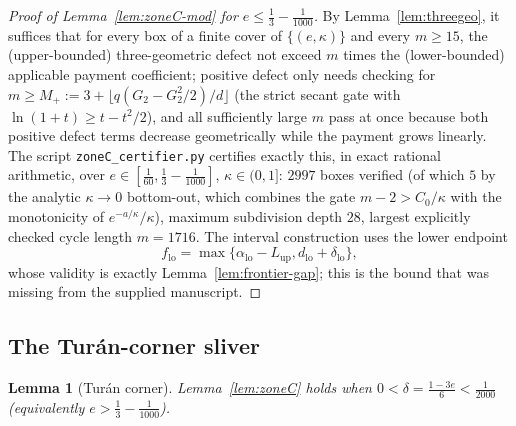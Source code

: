 \documentclass[11pt]{article}
\newtheorem{lemma}[theorem]{Lemma}
\begin{document}
\begin{proof}[Proof of Lemma~\ref{lem:zoneC-mod} for $e\le\tfrac13-\tfrac1{1000}$]
By Lemma~\ref{lem:threegeo}, it suffices that for every box of a finite cover
of $\{(e,\kappa)\}$ and every $m\ge15$, the (upper-bounded) three-geometric
defect not exceed $m$ times the (lower-bounded) applicable payment
coefficient; positive defect only needs checking for
$m\ge M_+:=3+\lfloor q(G_2-G_2^2/2)/d\rfloor$ (the strict secant
gate with $\ln(1+t)\ge t-t^2/2$), and all sufficiently large $m$ pass at once because
both positive defect terms decrease geometrically while the payment grows
linearly.  The script \texttt{zoneC\_certifier.py} certifies exactly this, in
exact rational arithmetic, over $e\in[\tfrac1{60},\tfrac13-\tfrac1{1000}]$,
$\kappa\in(0,1]$: $2997$ boxes verified (of which $5$ by the analytic
$\kappa\to0$ bottom-out, which combines the gate $m-2>C_0/\kappa$ with the
monotonicity of $e^{-a/\kappa}/\kappa$), maximum subdivision depth $28$,
largest explicitly checked cycle length $m=1716$.  The interval
construction uses the lower endpoint
\[
        f_{\mathrm{lo}}
        =\max\{\alpha_{\mathrm{lo}}-L_{\mathrm{up}},
                d_{\mathrm{lo}}+\delta_{\mathrm{lo}}\},
\]
whose validity is exactly Lemma~\ref{lem:frontier-gap}; this is the bound that
was missing from the supplied manuscript.
\end{proof}

\subsection{The Tur\'an-corner sliver}

\begin{lemma}[Tur\'an corner]\label{lem:turan}
Lemma~\ref{lem:zoneC} holds when
$0<\delta=\tfrac{1-3e}6<\tfrac1{2000}$
(equivalently $e>\tfrac13-\tfrac1{1000}$).
\end{lemma}
\end{document}

